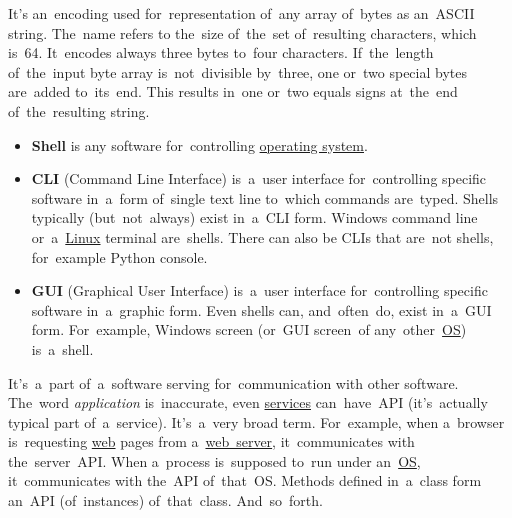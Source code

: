 \label{base64}
It's an~encoding used for~representation of~any array of~bytes as an~ASCII string. The~name refers to the~size of~the~set of~resulting characters, which is~64. It~encodes always three bytes to~four characters. If~the~length of~the~input byte array is~not~divisible by~three, one or~two special bytes are~added to~its~end. This results in~one or~two equals signs at~the~end of~the~resulting string.

\label{shellcligui}
\begin{itemize}
    \item \textbf{Shell} is any software for~controlling \hyperref[os]{operating system}.
    \item \textbf{CLI} (Command Line Interface) is~a~user interface for~controlling specific software in~a~form of~single text line to~which commands are~typed. Shells typically (but~not~always) exist in~a~CLI form. Windows command line or~a~\hyperref[linux]{Linux} terminal are~shells. There can also be CLIs that are~not shells, for~example Python console.
    \item \textbf{GUI} (Graphical User Interface) is~a~user interface for~controlling specific software in~a~graphic form. Even shells can, and~often~do, exist in~a~GUI form. For~example, Windows screen (or~GUI screen~of any~other~\hyperref[os]{OS}) is~a~shell.
\end{itemize}

\label{api}
It's~a~part of~a~software serving for~communication with other software. The~word \textit{application} is~inaccurate, even \hyperref[applicationprocessprogramservicethread]{services} can~have~API (it's~actually typical part of~a~service). It's~a~very broad term. For~example, when a~browser is~requesting \hyperref[internetweb]{web} pages from a~\hyperref[webserver]{web~server}, it~communicates with the~server~API. When a~process is~supposed to~run under an~\hyperref[os]{OS}, it~communicates with the~API of~that~OS. Methods defined in~a~class form an~API (of~instances) of~that~class. And~so~forth.
